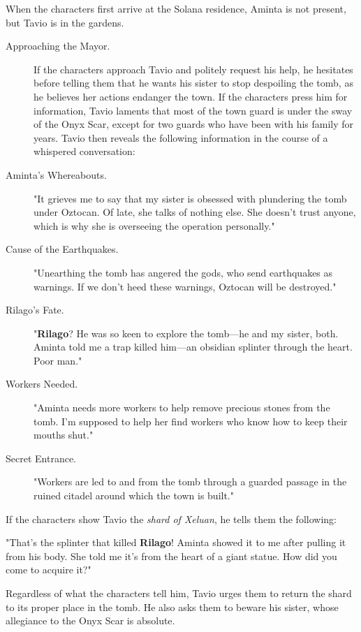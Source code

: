 \documentclass[10pt,a4paper,twoside,bg=print,twocolumn,openany,nodeprecatedcode]{dndbook}
\begin{document}
When the characters first arrive at the Solana residence, Aminta is not present, but Tavio is in the gardens.


\begin{description}
\item[Approaching the Mayor.]
If the characters approach Tavio and politely request his help, he hesitates before telling them that he wants his sister to stop despoiling the tomb, as he believes her actions endanger the town. If the characters press him for information, Tavio laments that most of the town guard is under the sway of the Onyx Scar, except for two guards who have been with his family for years. Tavio then reveals the following information in the course of a whispered conversation:
\item[Aminta's Whereabouts.]
"It grieves me to say that my sister is obsessed with plundering the tomb under Oztocan. Of late, she talks of nothing else. She doesn't trust anyone, which is why she is overseeing the operation personally."
\item[Cause of the Earthquakes.]
"Unearthing the tomb has angered the gods, who send earthquakes as warnings. If we don't heed these warnings, Oztocan will be destroyed."
\item[Rilago's Fate.]
"\textbf{Rilago}? He was so keen to explore the tomb—he and my sister, both. Aminta told me a trap killed him—an obsidian splinter through the heart. Poor man."
\item[Workers Needed.]
"Aminta needs more workers to help remove precious stones from the tomb. I'm supposed to help her find workers who know how to keep their mouths shut."
\item[Secret Entrance.]
"Workers are led to and from the tomb through a guarded passage in the ruined citadel around which the town is built."
\end{description}

If the characters show Tavio the \textit{shard of Xeluan}, he tells them the following:

\begin{DndReadAloud}{}
"That's the splinter that killed \textbf{Rilago}! Aminta showed it to me after pulling it from his body. She told me it's from the heart of a giant statue. How did you come to acquire it?"

\end{DndReadAloud}

Regardless of what the characters tell him, Tavio urges them to return the shard to its proper place in the tomb. He also asks them to beware his sister, whose allegiance to the Onyx Scar is absolute.
\end{document}
